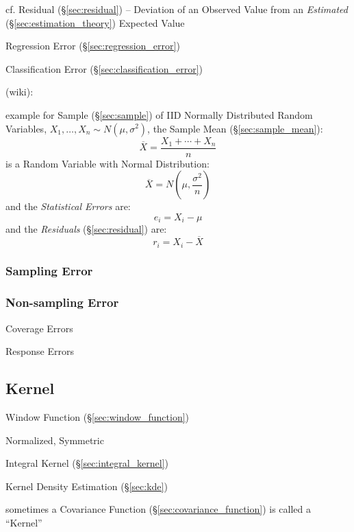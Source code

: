 cf. Residual (\S\ref{sec:residual}) -- Deviation of an Observed Value from an
\emph{Estimated} (\S\ref{sec:estimation_theory}) Expected Value

\fist Regression Error (\S\ref{sec:regression_error})

\fist Classification Error (\S\ref{sec:classification_error})

(wiki):

example for Sample (\S\ref{sec:sample}) of IID Normally Distributed Random
Variables, $X_1, \ldots, X_n \sim N(\mu, \sigma^2)$, the Sample Mean
(\S\ref{sec:sample_mean}):
\[
  \overline{X} = \frac{X_1 + \cdots + X_n}{n}
\]
is a Random Variable with Normal Distribution:
\[
  \overline{X} = N(\mu, \frac{\sigma^2}{n})
\]
and the \emph{Statistical Errors} are:
\[
  e_i = X_i - \mu
\]
and the \emph{Residuals} (\S\ref{sec:residual}) are:
\[
  r_i = X_i - \overline{X}
\]



\subsubsection{Sampling Error}\label{sec:sampling_error}

\subsubsection{Non-sampling Error}\label{sec:nonsampling_error}

Coverage Errors

Response Errors



\subsection{Kernel}\label{sec:distribution_kernel}

Window Function (\S\ref{sec:window_function})

Normalized, Symmetric

\fist Integral Kernel (\S\ref{sec:integral_kernel})

\fist Kernel Density Estimation (\S\ref{sec:kde})

\fist sometimes a Covariance Function (\S\ref{sec:covariance_function}) is
called a ``Kernel''



